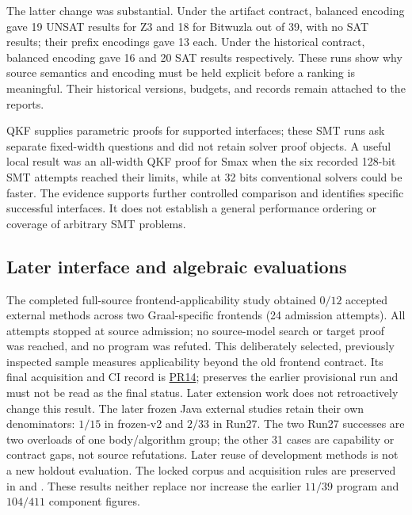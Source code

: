 The latter change was substantial. Under the artifact contract, balanced encoding gave 19 UNSAT results for Z3 and 18 for Bitwuzla out of 39, with no SAT results; their prefix encodings gave 13 each. Under the historical contract, balanced encoding gave 16 and 20 SAT results respectively. These runs show why source semantics and encoding must be held explicit before a ranking is meaningful. Their historical versions, budgets, and records remain attached to the reports.

QKF supplies parametric proofs for supported interfaces; these SMT runs ask separate fixed-width questions and did not retain solver proof objects. A useful local result was an all-width QKF proof for Smax when the six recorded 128-bit SMT attempts reached their limits, while at 32 bits conventional solvers could be faster. The evidence supports further controlled comparison and identifies specific successful interfaces. It does not establish a general performance ordering or coverage of arbitrary SMT problems.

\subsection{Later interface and algebraic evaluations}
The completed full-source frontend-applicability study obtained $0/12$ accepted external methods across two Graal-specific frontends (24 admission attempts). All attempts stopped at source admission; no source-model search or target proof was reached, and no program was refuted. This deliberately selected, previously inspected sample measures applicability beyond the old frontend contract. Its final acquisition and CI record is \href{https://github.com/Len989/QKF-Certifier/pull/14}{PR14};  preserves the earlier provisional run and must not be read as the final status. Later extension work does not retroactively change this result. The later frozen Java external studies retain their own denominators: $1/15$ in frozen-v2 and $2/33$ in Run27. The two Run27 successes are two overloads of one body/algorithm group; the other 31 cases are capability or contract gaps, not source refutations. Later reuse of development methods is not a new holdout evaluation. The locked corpus and acquisition rules are preserved in  and . These results neither replace nor increase the earlier $11/39$ program and $104/411$ component figures.

